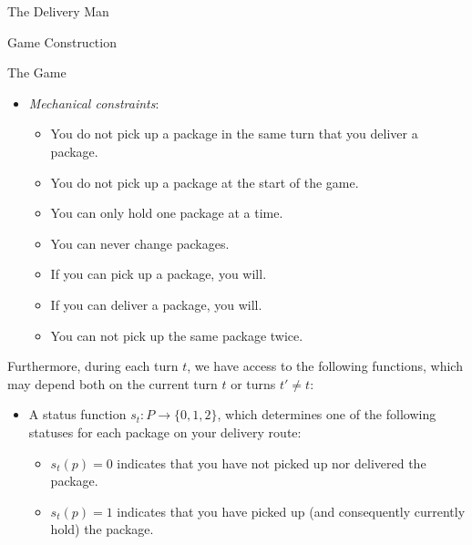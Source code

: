 \begin{section}{The Delivery Man}
\begin{subsection}{Game Construction}
\begin{subsubsection}{The Game}
\begin{itemize}
\begin{itemize}
          \item A package $(p, d)$ is \textbf{picked up} in turn $t$ if you arrive at node $p = (i, j)$ at turn $t$, and you do not hold a package when you arrive.

          \item You \textbf{hold} a package $p$ in turn $t$ if you've picked up $p$ in turn $t' \leq t$ and have not yet delivered the package. 

          \item A package $(p, d)$ is \textbf{delivered} in turn $t$ if you arrive at node $d = (i, j)$ at turn $t$ and you hold the package $(p, d)$.  

          \end{itemize}
          
        \item \textit{Mechanical constraints}:
          \begin{itemize}
          \item You do not pick up a package in the same turn that you deliver a package.
          \item You do not pick up a package at the start of the game.
          \item You can only hold one package at a time.
          \item You can never change packages.
          \item If you can pick up a package, you will.
          \item If you can deliver a package, you will.
          \item You can not pick up the same package twice.
          \end{itemize}
      \end{itemize}

      Furthermore, during each turn $t$, we have access to the following functions, which may depend both on the current turn $t$ or turns $t' \neq t$:
      \begin{itemize}
      \item A status function $s_t: P \rightarrow \{0,1,2 \}$, which determines one of the following statuses for each package on your delivery route:
        \begin{itemize}
        \item $s_t(p) = 0$ indicates that you have not picked up nor delivered the package.
        \item $s_t(p) = 1$ indicates that you have picked up (and consequently currently hold) the package.
          

\end{itemize}
\end{itemize}
\end{subsubsection}
\end{subsection}
\end{section}
